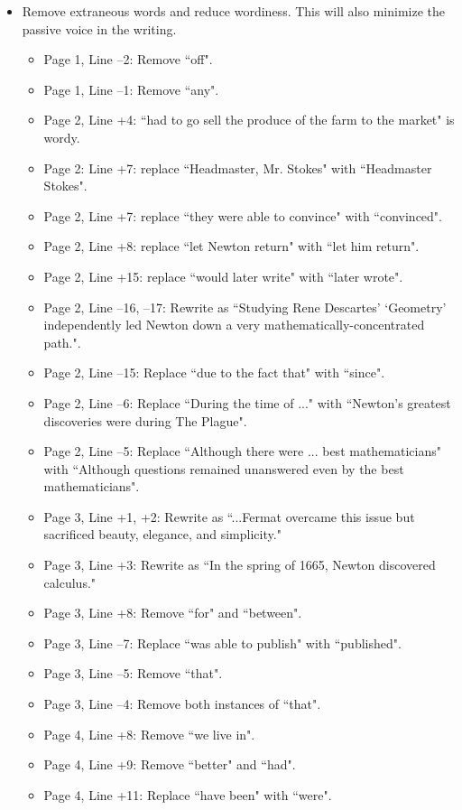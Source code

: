\documentclass[11pt]{article}
\begin{document}
\begin{itemize}
	\item Remove extraneous words and reduce wordiness. This will also minimize the passive voice in the writing.
	\begin{itemize}
		\item Page 1, Line --2: Remove ``off".
		\item Page 1, Line --1: Remove ``any".
		\item Page 2, Line +4: ``had to go sell the produce of the farm to the market" is wordy.
		\item Page 2: Line +7: replace ``Headmaster, Mr. Stokes" with ``Headmaster Stokes".
		\item Page 2, Line +7: replace ``they were able to convince" with ``convinced".
		\item Page 2, Line +8: replace ``let Newton return" with ``let him return".
		\item Page 2, Line +15: replace ``would later write" with ``later wrote".
		\item Page 2, Line --16, --17: Rewrite as ``Studying Rene Descartes' `Geometry' independently led Newton down a very mathematically-concentrated path.".
		\item Page 2, Line --15: Replace ``due to the fact that" with ``since".
		\item Page 2, Line --6: Replace ``During the time of ..." with ``Newton's greatest discoveries were during The Plague".
		\item Page 2, Line --5: Replace ``Although there were ... best mathematicians" with ``Although questions remained unanswered even by the best mathematicians".
		\item Page 3, Line +1, +2: Rewrite as ``...Fermat overcame this issue but sacrificed beauty, elegance, and simplicity."
		\item Page 3, Line +3: Rewrite as ``In the spring of 1665, Newton discovered calculus."
		\item Page 3, Line +8: Remove ``for" and ``between".
		\item Page 3, Line --7: Replace ``was able to publish" with ``published".
		\item Page 3, Line --5: Remove ``that".
		\item Page 3, Line --4: Remove both instances of ``that".
		\item Page 4, Line +8: Remove ``we live in".
		\item Page 4, Line +9: Remove ``better" and ``had".
		\item Page 4, Line +11: Replace ``have been" with ``were".

\end{itemize}
\end{itemize}
\end{document}
